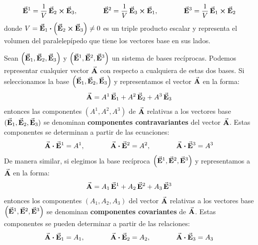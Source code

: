 \documentclass[hidelinks,12pt]{article}
\begin{document}
\begin{align*}
\va{E}^{1} = \dfrac{1}{V} \, \va{E}_{2} \cross \va{E}_{3}, \hspace{1.3cm} \va{E}^{2} = \dfrac{1}{V} \, \va{E}_{3} \cross \va{E}_{1}, \hspace{1.3cm} \va{E}^{3} = \dfrac{1}{V} \, \va{E}_{1} \cross \va{E}_{2}
\end{align*}
donde $V = \va{E}_{1} \vdot \left( \va{E}_{2} \cross \va{E}_{3} \right) \neq 0$ es un triple producto escalar y representa el volumen del paralelepípedo que tiene los vectores base en sus lados.
\par
Sean $\left( \va{E}_{1}, \va{E}_{2}, \va{E}_{3} \right)$ y $\left( \va{E}^{1}, \va{E}^{2}, \va{E}^{3} \right)$ un sistema de bases recíprocas. Podemos representar cualquier vector $\va{A}$ con respecto a cualquiera de estas dos bases. Si seleccionamos la base $\left( \va{E}_{1}, \va{E}_{2}, \va{E}_{3} \right)$ y representamos el vector $\va{A}$ en la forma:
\begin{align}
\va{A} = A^{1} \, \va{E}_{1} + A^{2} \, \va{E}_{2} + A^{3} \, \va{E}_{3}
\label{ec:ecuacion_01_02_01}
\end{align}
entonces las componentes $\left( A^{1}, A^{2}, A^{3} \right)$ de $\va{A}$ relativas a los vectores base $(\va{E}_{1}, \va{E}_{2}, \va{E}_{3})$ se denominan \textbf{componentes contravariantes} del vector $\va{A}$. Estas componentes se determinan a partir de las ecuaciones:
\begin{align*}
\va{A} \vdot \va{E}^{1} = A^{1}, \hspace{1.3cm} \va{A} \vdot \va{E}^{2} = A^{2}, \hspace{1.3cm} \va{A} \vdot \va{E}^{3} = A^{3}
\end{align*}
De manera similar, si elegimos la base recíproca $\left( \va{E}^{1}, \va{E}^{2}, \va{E}^{3} \right)$ y representamos a $\va{A}$ en la forma:
\begin{align}
\va{A} = A_{1} \, \va{E}^{1} + A_{2} \, \va{E}^{2} + A_{3} \, \va{E}^{3}
\label{ec:ecuacion_01_02_02}
\end{align}
entonces los componentes $\left( A_{1}, A_{2}, A_{3} \right)$ del vector $\va{A}$ relativas a los vectores base $\left( \va{E}^{1}, \va{E}^{2}, \va{E}^{3} \right)$ se denominan \textbf{componentes covariantes} de $\va{A}$. Estas componentes se pueden determinar a partir de las relaciones:
\begin{align*}
\va{A} \vdot \va{E}_{1} = A_{1}, \hspace{1.3cm} \va{A} \vdot \va{E}_{2} = A_{2}, \hspace{1.3cm} \va{A} \vdot \va{E}_{3} = A_{3}
\end{align*}    
\end{document}
